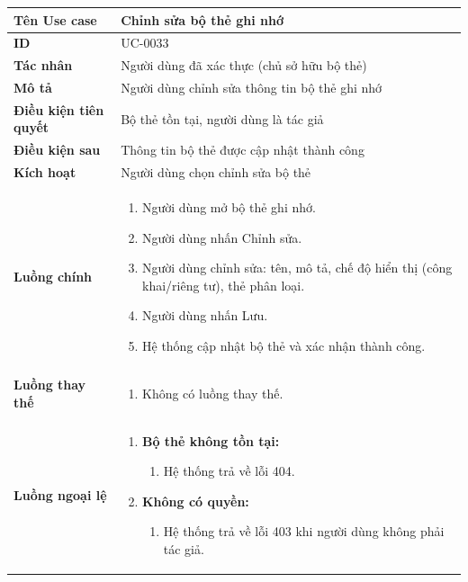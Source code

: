 {
\renewcommand{\arraystretch}{1.5}

\begin{tabularx}{\textwidth}{|>{\raggedright\arraybackslash}X|>{\raggedright\arraybackslash}X|}
\hline
\textbf{Tên Use case} & Chỉnh sửa bộ thẻ ghi nhớ \\
\hline
\textbf{ID} & UC-0033 \\
\hline
\textbf{Tác nhân} & Người dùng đã xác thực (chủ sở hữu bộ thẻ) \\
\hline
\textbf{Mô tả} & Người dùng chỉnh sửa thông tin bộ thẻ ghi nhớ \\
\hline
\textbf{Điều kiện tiên quyết} & Bộ thẻ tồn tại, người dùng là tác giả \\
\hline
\textbf{Điều kiện sau} & Thông tin bộ thẻ được cập nhật thành công \\
\hline
\textbf{Kích hoạt} & Người dùng chọn chỉnh sửa bộ thẻ \\
\hline
\textbf{Luồng chính} &
\begin{enumerate}
    \item Người dùng mở bộ thẻ ghi nhớ.
    \item Người dùng nhấn Chỉnh sửa.
    \item Người dùng chỉnh sửa: tên, mô tả, chế độ hiển thị (công khai/riêng tư), thẻ phân loại.
    \item Người dùng nhấn Lưu.
    \item Hệ thống cập nhật bộ thẻ và xác nhận thành công.
\end{enumerate} \\
\hline
\textbf{Luồng thay thế} &
\begin{enumerate}
    \item Không có luồng thay thế.
\end{enumerate} \\
\hline
\textbf{Luồng ngoại lệ} &
\begin{enumerate}
    \item \textbf{Bộ thẻ không tồn tại:}
    \begin{enumerate}
        \item[1Err.] Hệ thống trả về lỗi 404.
    \end{enumerate}
    \item \textbf{Không có quyền:}
    \begin{enumerate}
        \item[1Err2.] Hệ thống trả về lỗi 403 khi người dùng không phải tác giả.
    \end{enumerate}
\end{enumerate} \\
\hline
\end{tabularx}
}
